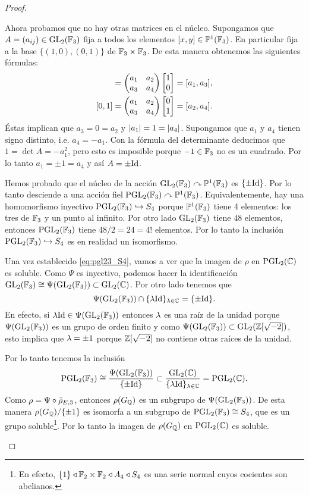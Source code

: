 \documentclass[../../tesis_maestria]{subfiles}
\begin{document}
\begin{proof}
\begin{enumerate}[label=\emph{\roman*})]
    \-\;\; Ahora probamos que no hay otras matrices en el núcleo. Supongamos que $A=(a_{ij})\in\mathrm{GL}_2(\mathbb{F}_3)$ fija a todos los elementos $[x,y]\in\mathbb{P}^1(\mathbb{F}_3)$. En particular fija a la base $\{(1,0),(0,1)\}$ de $\mathbb{F}_3\times\mathbb{F}_3$. De esta manera obtenemos las siguientes fórmulas:
    \begin{align*}
			[1,0]=\mat{a_1}{a_2}{a_3}{a_4}\begin{bmatrix}1\\0\end{bmatrix}=[a_1,a_3],\\
			[0,1]=\mat{a_1}{a_2}{a_3}{a_4}\begin{bmatrix}0\\1\end{bmatrix}=[a_2,a_4].
    \end{align*}
    Éstas implican que $a_3=0=a_2$ y $\left| a_1 \right|=1=\left| a_4 \right|$. Supongamos que $a_1$ y $a_4$ tienen signo distinto, i.e. $a_4=-a_1$. Con la fórmula del determinante deducimos que $1=\det A=-a_1^2$, pero esto es imposible porque $-1\in\mathbb{F}_3$ no es un cuadrado. Por lo tanto $a_1=\pm1=a_4$ y as\'i $A=\pm\mathrm{Id}$.
    
    \-\;\; Hemos probado que el núcleo de la acción $\mathrm{GL}_2(\mathbb{F}_3)\curvearrowright\mathbb{P}^1(\mathbb{F}_3)$ es $\{\pm\mathrm{Id}\}$. Por lo tanto desciende a una acción fiel $\mathrm{PGL}_2(\mathbb{F}_3)\curvearrowright\mathbb{P}^1(\mathbb{F}_3)$. Equivalentemente, hay una homomorfismo inyectivo $\mathrm{PGL}_2(\mathbb{F}_3)\hookrightarrow S_4$ porque $\mathbb{P}^1(\mathbb{F}_3)$ tiene 4 elementos: los tres de $\mathbb{F}_3$ y un punto al infinito. Por otro lado $\mathrm{GL}_2(\mathbb{F}_3)$ tiene $48$ elementos, entonces $\mathrm{PGL}_2(\mathbb{F}_3)$ tiene $48/2=24=4!$ elementos. Por lo tanto la inclusión $\mathrm{PGL}_2(\mathbb{F}_3)\hookrightarrow S_4$ es en realidad un isomorfismo.

    \-\;\; Una vez establecido \eqref{eq:pgl23_S4}, vamos a ver que la imagen de $\rho$ en $\mathrm{PGL}_2(\mathbb{C})$ es soluble. Como $\Psi$ es inyectivo, podemos hacer la identificación $\mathrm{GL}_2(\mathbb{F}_3)\cong\Psi(\mathrm{GL}_2(\mathbb{F}_3))\subset\mathrm{GL}_2(\mathbb{C})$. Por otro lado tenemos que
    \[
      \Psi(\mathrm{GL}_2(\mathbb{F}_3))\cap\{\lambda\mathrm{Id}\}_{\lambda\in\mathbb{C}}=\{\pm\mathrm{Id}\}.
    \]
    En efecto, si $\lambda\mathrm{Id}\in\Psi(\mathrm{GL}_2(\mathbb{F}_3))$ entonces $\lambda$ es una ra\'iz de la unidad porque $\Psi(\mathrm{GL}_2(\mathbb{F}_3))$ es un grupo de orden finito y como $\Psi(\mathrm{GL}_2(\mathbb{F}_3))\subset\mathrm{GL}_2(\mathbb{Z}[\sqrt{-2}])$, esto implica que $\lambda=\pm1$ porque $\mathbb{Z}[\sqrt{-2}]$ no contiene otras raíces de la unidad.

    \-\;\; Por lo tanto tenemos la inclusión
\[
	\mathrm{PGL}_2(\mathbb{F}_3)\cong\frac{\Psi(\mathrm{GL}_2(\mathbb{F}_3))}{\{\pm\mathrm{Id}\}}\subset\frac{\mathrm{GL}_2(\mathbb{C})}{\{\lambda\mathrm{Id}\}_{\lambda\in\mathbb{C}}}=\mathrm{PGL}_2(\mathbb{C}).
\]
Como $\rho=\Psi\circ\bar{\rho}_{E,3}$, entonces $\rho(G_{\mathbb{Q}})$ es un subgrupo de $\Psi(\mathrm{GL}_2(\mathbb{F}_3))$. De esta manera $\rho(G_{\mathbb{Q}})/\{\pm1\}$ es isomorfa a un subgrupo de $\mathrm{PGL}_2(\mathbb{F}_3)\cong S_4$, que es un grupo soluble\footnote{En efecto, $\{1\}\triangleleft \mathbb{F}_2\times\mathbb{F}_2 \triangleleft A_4 \triangleleft S_4$ es una serie normal cuyos cocientes son abelianos.}. Por lo tanto la imagen de $\rho(G_{\mathbb{Q}})$ en $\mathrm{PGL}_2(\mathbb{C})$ es soluble.


\end{enumerate}
\end{proof}
\end{document}
